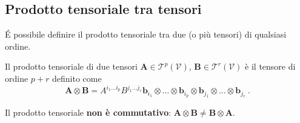 \subsection{Prodotto tensoriale tra tensori}
\'E possibile definire il prodotto tensoriale tra due (o più tensori) di qualsiasi ordine.
\begin{definition}
 Il prodotto tensoriale di due tensori $\bm{A} \in \mathcal{T}^p(\mathcal{V})$, $\bm{B} \in \mathcal{T}^r(\mathcal{V})$ è il tensore di ordine $p+r$ definito come
\begin{equation}
 \bm{A}\otimes\bm{B} = 
   A^{i_1 \dots i_p} B^{j_1 \dots j_r} \bm{b}_{i_1} \otimes \dots \otimes \bm{b}_{i_p}
    \otimes \bm{b}_{j_1} \otimes \dots \otimes \bm{b}_{j_r} \ .
\end{equation}
\end{definition}

 \noindent
 \begin{remark}
     Il prodotto tensoriale \textbf{non è commutativo}: $\bm{A} \otimes \bm{B} \neq \bm{B} \otimes \bm{A}$.
 \end{remark}

%

 
%

